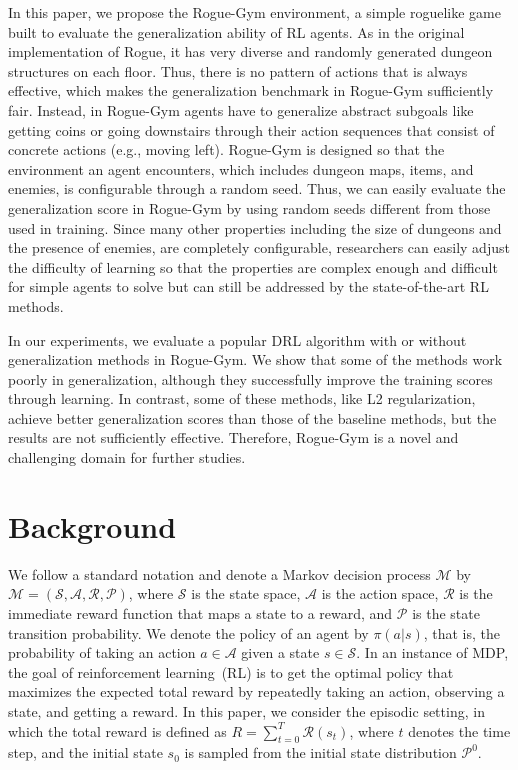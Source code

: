 \documentclass[conference]{IEEEtran}
\begin{document}
In this paper, we propose the Rogue-Gym environment, a simple roguelike
game built to evaluate the generalization ability of RL agents.
As in the original implementation of Rogue, it has very diverse and
randomly generated dungeon structures on each floor.
Thus, there is no pattern of actions that is always effective, which
makes the generalization benchmark in Rogue-Gym sufficiently fair.
Instead, in Rogue-Gym agents have to generalize abstract subgoals like
getting coins or going downstairs through their action sequences
that consist of concrete actions (e.g., moving left).
Rogue-Gym is designed so that the environment an agent encounters,
which includes dungeon maps, items, and enemies, is configurable through
a random seed.
Thus, we can easily evaluate the generalization score in Rogue-Gym by
using random seeds different from those used in training.
Since many other properties including the size of dungeons and the
presence of enemies, are completely configurable, researchers can easily
adjust the difficulty of learning so that the properties are complex
enough and difficult for simple agents to solve but can still be
addressed by the state-of-the-art RL methods.

In our experiments, we evaluate a popular DRL algorithm with or without
generalization methods in Rogue-Gym.
We show that some of the methods work poorly in generalization, although they
successfully improve the training scores through learning.
In contrast, some of these methods, like L2 regularization, achieve better
generalization scores than those of the baseline methods, but
the results are not sufficiently effective. 
Therefore, Rogue-Gym is a novel and challenging domain for further studies. 

\section{Background}\label{section:background}
We follow a standard notation and denote a Markov decision process
$\mathcal M$ by $\mathcal{M} = (\mathcal{S,A,R,P})$, where $\mathcal S$
is the state space, $\mathcal A$ is the action space, $\mathcal R$ is
the immediate reward function that maps a state to a reward, and
$\mathcal P$ is the state transition probability.
We denote the policy of an agent by $\pi(a|s)$,
that is, the probability of taking an action
$a\in\mathcal{A}$ given a state $s\in\mathcal{S}$.
In an instance of MDP, the goal of reinforcement
learning~\cite{SuttonBarto2018}(RL) is to get the optimal policy that
maximizes the expected total reward by repeatedly taking an action,
observing a state, and getting a reward.
In this paper, we consider the episodic setting, in which the total
reward is defined as $R = \sum_{t=0}^T \mathcal{R}(s_t)$, where $t$
denotes the time step, and the initial state $s_0$ is sampled from the
initial state distribution $\mathcal{P}^0$.
\end{document}
